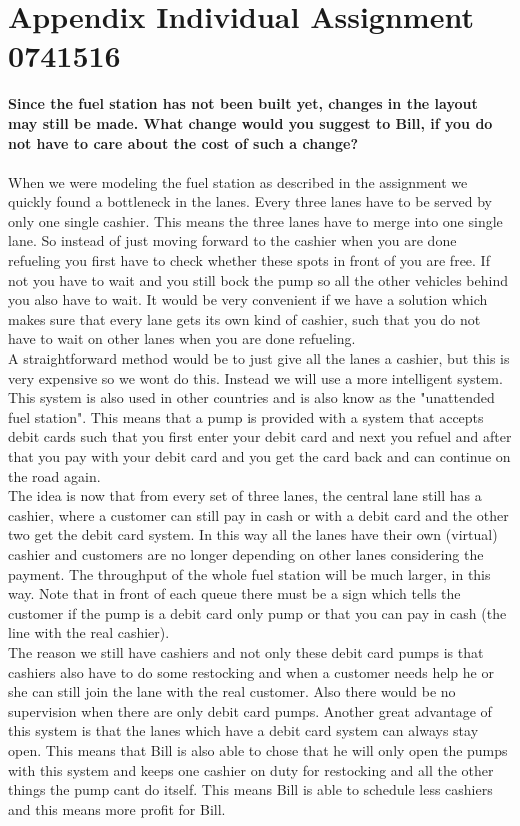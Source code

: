 \section{Appendix Individual Assignment 0741516}\label{app:indivjasper}
\textbf{Since the fuel station has not been built yet, changes in the layout may still be made. What change would you suggest to Bill, if you do not have to care about the cost of such a change?}\\
\\
When we were modeling the fuel station as described in the assignment we quickly found a bottleneck in the lanes. Every three lanes have to be served by only one single cashier. This means the three lanes have to merge into one single lane. So instead of just moving forward to the cashier when you are done refueling you first have to check whether these spots in front of you are free. If not you have to wait and you still bock the pump so all the other vehicles behind you also have to wait. It would be very convenient if we have a solution which makes sure that every lane gets its own kind of cashier, such that you do not have to wait on other lanes when you are done refueling.\\
A straightforward method would be to just give all the lanes a cashier, but this is very expensive so we wont do this. Instead we will use a more intelligent system. This system is also used in other countries and is also know as the "unattended fuel station". This means that a pump is provided with a system that accepts debit cards such that you first enter your debit card and next you refuel and after that you pay with your debit card and you get the card back and can continue on the road again. \\
The idea is now that from every set of three lanes, the central lane still has a cashier, where a customer can still pay in cash or with a debit card and the other two get the debit card system. In this way all the lanes have their own (virtual) cashier and customers are no longer depending on other lanes considering the payment. The throughput of the whole fuel station will be much larger, in this way. Note that in front of each queue there must be a sign which tells the customer if the pump is a debit card only pump or that you can pay in cash (the line with the real cashier).\\
The reason we still have cashiers and not only these debit card pumps is that cashiers also have to do some restocking and when a customer needs help he or she can still join the lane with the real customer. Also there would be no supervision when there are only debit card pumps. Another great advantage of this system is that the lanes which have a debit card system can always stay open. This means that Bill is also able to chose that he will only open the pumps with this system and keeps one cashier on duty for restocking and all the other things the pump cant do itself. This means Bill is able to schedule less cashiers and this means more profit for Bill.